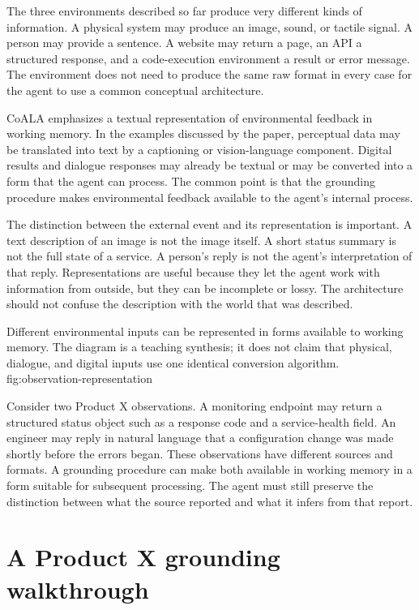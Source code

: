 The three environments described so far produce very different kinds of information. A physical system may produce an image, sound, or tactile signal. A person may provide a sentence. A website may return a page, an API a structured response, and a code-execution environment a result or error message. The environment does not need to produce the same raw format in every case for the agent to use a common conceptual architecture.

CoALA emphasizes a textual representation of environmental feedback in working memory. In the examples discussed by the paper, perceptual data may be translated into text by a captioning or vision-language component. Digital results and dialogue responses may already be textual or may be converted into a form that the agent can process. The common point is that the grounding procedure makes environmental feedback available to the agent's internal process.

The distinction between the external event and its representation is important. A text description of an image is not the image itself. A short status summary is not the full state of a service. A person's reply is not the agent's interpretation of that reply. Representations are useful because they let the agent work with information from outside, but they can be incomplete or lossy. The architecture should not confuse the description with the world that was described.

  {Different environmental inputs can be represented in forms available to working memory. The diagram is a teaching synthesis; it does not claim that physical, dialogue, and digital inputs use one identical conversion algorithm.}
  {fig:observation-representation}

Consider two Product X observations. A monitoring endpoint may return a structured status object such as a response code and a service-health field. An engineer may reply in natural language that a configuration change was made shortly before the errors began. These observations have different sources and formats. A grounding procedure can make both available in working memory in a form suitable for subsequent processing. The agent must still preserve the distinction between what the source reported and what it infers from that report.

\section{A Product X grounding walkthrough}
\label{sec:productx-grounding}


